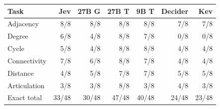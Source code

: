 \begin{tabular}{lrrrrrr}
\toprule
Task & Jev & 27B G & 27B T & 9B T & Decider & Kev \\
\midrule
Adjacency & 8/8 & 8/8 & 8/8 & 8/8 & 7/8 & 7/8 \\
Degree & 6/8 & 4/8 & 8/8 & 7/8 & 0/8 & 0/8 \\
Cycle & 5/8 & 4/8 & 8/8 & 8/8 & 4/8 & 4/8 \\
Connectivity & 7/8 & 6/8 & 8/8 & 7/8 & 4/8 & 4/8 \\
Distance & 4/8 & 5/8 & 7/8 & 7/8 & 5/8 & 5/8 \\
Articulation & 3/8 & 3/8 & 8/8 & 3/8 & 4/8 & 3/8 \\
Exact total & 33/48 & 30/48 & 47/48 & 40/48 & 24/48 & 23/48 \\
\bottomrule
\end{tabular}

